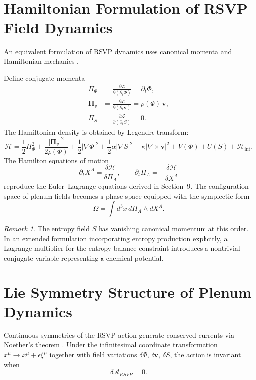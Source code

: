 \documentclass[12pt,a4paper]{article}
\theoremstyle{plain}
\theoremstyle{definition}
\theoremstyle{remark}
\newtheorem{remark}{Remark}
\begin{document}
\section{Hamiltonian Formulation of RSVP Field Dynamics}

An equivalent formulation of RSVP dynamics uses canonical momenta
and Hamiltonian mechanics \cite{Frankel,Nakahara,BaezMunian}.

Define conjugate momenta
\begin{align}
\Pi_\Phi &= \frac{\partial \mathcal{L}}{\partial(\partial_t \Phi)}
= \partial_t \Phi, \\
\boldsymbol{\Pi}_v &= \frac{\partial \mathcal{L}}{\partial(\partial_t \mathbf{v})}
= \rho(\Phi)\,\mathbf{v}, \\
\Pi_S &= \frac{\partial \mathcal{L}}{\partial(\partial_t S)} = 0.
\end{align}
The Hamiltonian density is obtained by Legendre transform:
\begin{equation}
\mathcal{H} =
\frac{1}{2}\Pi_\Phi^2
+ \frac{|\boldsymbol{\Pi}_v|^2}{2\rho(\Phi)}
+ \frac{1}{2}|\nabla \Phi|^2
+ \frac{1}{2}\alpha|\nabla S|^2
+ \kappa|\nabla\times\mathbf{v}|^2
+ V(\Phi) + U(S)
+ \mathcal{H}_{\text{int}}.
\end{equation}
The Hamilton equations of motion
\begin{equation}
\partial_t X^A = \frac{\delta \mathcal{H}}{\delta \Pi_A}, \qquad
\partial_t \Pi_A = -\frac{\delta \mathcal{H}}{\delta X^A}
\end{equation}
reproduce the Euler--Lagrange equations derived in Section~9. The
configuration space of plenum fields becomes a phase space equipped
with the symplectic form
\begin{equation}
\Omega = \int d^3x\, d\Pi_A \wedge dX^A.
\end{equation}

\begin{remark}
The entropy field $S$ has vanishing canonical momentum at this order.
In an extended formulation incorporating entropy production explicitly,
a Lagrange multiplier for the entropy balance constraint introduces a
nontrivial conjugate variable representing a chemical potential.
\end{remark}

\section{Lie Symmetry Structure of Plenum Dynamics}

Continuous symmetries of the RSVP action generate conserved currents
via Noether's theorem \cite{Frankel,WeinbergQFT}. Under the
infinitesimal coordinate transformation $x^\mu \to x^\mu + \epsilon\xi^\mu$
together with field variations $\delta\Phi$, $\delta\mathbf{v}$,
$\delta S$, the action is invariant when
\begin{equation}
\delta\mathcal{A}_{RSVP} = 0.
\end{equation}
\end{document}
